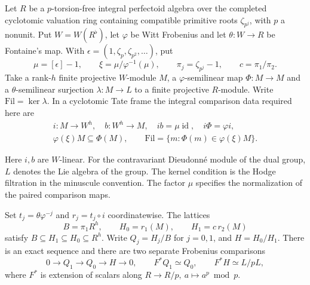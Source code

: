 \begin{auxlemma}\label{lem:flag-local-cyclotomic-chain}
Let \(R\) be a \(p\)-torsion-free integral perfectoid algebra over the completed cyclotomic valuation ring containing compatible primitive roots \(\zeta_{p^j}\), with \(p\) a nonunit. Put \(W=W(R^\flat)\), let \(\varphi\) be Witt Frobenius and let \(\theta:W\to R\) be Fontaine's map. With \(\epsilon=(1,\zeta_p,\zeta_{p^2},\ldots)\), put
\[
 \mu=[\epsilon]-1,\qquad \xi=\mu/\varphi^{-1}(\mu),\qquad
 \pi_j=\zeta_{p^j}-1,\qquad c=\pi_1/\pi_2 .
\]
Take a rank-\(h\) finite projective \(W\)-module \(M\), a \(\varphi\)-semilinear map \(\Phi:M\to M\) and a \(\theta\)-semilinear surjection \(\lambda:M\to L\) to a finite projective \(R\)-module. Write \(\mathrm{Fil}=\ker\lambda\). In a cyclotomic Tate frame the integral comparison data required here are
\begin{equation}\label{eq:flag-cyclotomic-frame}
 \begin{gathered}
 i:M\longrightarrow W^h,\quad b:W^h\longrightarrow M,\quad
 ib=\mu\operatorname{id},\quad i\Phi=\varphi i,\\
 \varphi(\xi)M\subseteq\Phi(M),\qquad
 \mathrm{Fil}=\{m:\Phi(m)\in\varphi(\xi)M\}.
 \end{gathered}
\end{equation}

Here \(i,b\) are \(W\)-linear. For the contravariant Dieudonn\'e module of the dual group, \(L\) denotes the Lie algebra of the group. The kernel condition is the Hodge filtration in the minuscule convention. The factor \(\mu\) specifies the normalization of the paired comparison maps. \cite{prismatic-flag}

Set \(t_j=\theta\varphi^{-j}\) and \(r_j=t_j\circ i\) coordinatewise. The lattices
\[
 B=\pi_1R^h,\qquad H_0=r_1(M),\qquad H_1=c\,r_2(M)
\]
satisfy \(B\subseteq H_1\subseteq H_0\subseteq R^h\). Write \(Q_j=H_j/B\) for \(j=0,1\), and \(H=H_0/H_1\). There is an exact sequence and there are two separate Frobenius comparisons
\begin{equation}\label{eq:flag-two-frobenius-quotients}
 0\longrightarrow Q_1\longrightarrow Q_0\longrightarrow H\longrightarrow0,
 \qquad F^*Q_1\simeq Q_0,\qquad F^*H\simeq L/pL ,
\end{equation}
where \(F^*\) is extension of scalars along \(R\to R/p,\ a\mapsto a^p\bmod p\).
\end{auxlemma}

